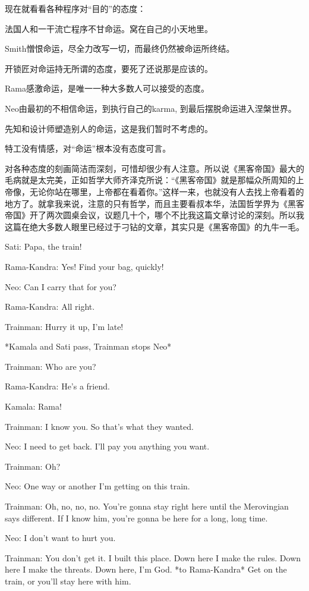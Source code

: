 \documentclass[UTF8]{ctexart}
\newenvironment{myquote}{\color{green} \setlength{\leftskip}{6em} \setlength{\rightskip}{4em} \setlength{\parindent}{-2em}}{\par}
\begin{document}
现在就看看各种程序对“目的”的态度：

法国人和一干流亡程序不甘命运。窝在自己的小天地里。

Smith憎恨命运，尽全力改写一切，而最终仍然被命运所终结。

开锁匠对命运持无所谓的态度，要死了还说那是应该的。

Rama感激命运，是唯一一种大多数人可以接受的态度。

Neo由最初的不相信命运，到执行自己的karma, 到最后摆脱命运进入涅槃世界。

先知和设计师塑造别人的命运，这是我们暂时不考虑的。

特工没有情感，对“命运”根本没有态度可言。

对各种态度的刻画简洁而深刻，可惜却很少有人注意。所以说《黑客帝国》最大的毛病就是太完美，正如哲学大师齐泽克所说：“《黑客帝国》就是那幅众所周知的上帝像，无论你站在哪里，上帝都在看着你。”这样一来，也就没有人去找上帝看着的地方了。就拿我来说，注意的只有哲学，而且主要看叔本华，法国哲学界为《黑客帝国》开了两次圆桌会议，议题几十个，哪个不比我这篇文章讨论的深刻。所以我这篇在绝大多数人眼里已经过于刁钻的文章，其实只是《黑客帝国》的九牛一毛。

\begin{myquote}
Sati: Papa, the train!

Rama-Kandra: Yes! Find your bag, quickly!

Neo: Can I carry that for you?

Rama-Kandra: All right.

Trainman: Hurry it up, I'm late!

*Kamala and Sati pass, Trainman stops Neo*

Trainman: Who are you?

Rama-Kandra: He's a friend.

Kamala: Rama!

Trainman: I know you. So that's what they wanted.

Neo: I need to get back. I'll pay you anything you want.

Trainman: Oh?

Neo: One way or another I'm getting on this train.

Trainman: Oh, no, no, no. You're gonna stay right here until the Merovingian says different. If I know him, you're gonna be here for a long, long time.

Neo: I don't want to hurt you.

Trainman: You don't get it. I built this place. Down here I make the rules. Down here I make the threats. Down here, I'm God. *to Rama-Kandra* Get on the train, or you'll stay here with him.
\end{myquote}
\end{document}
